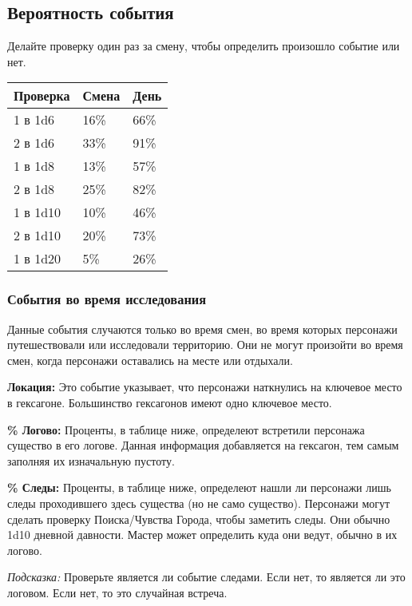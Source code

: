 \subsection*{Вероятность события}

Делайте проверку один раз за смену, чтобы определить произошло событие или нет.

\begin{table}[H]
  \centering
  \begin{tabular}{*3{l}}
    \toprule
    Проверка & Смена & День \\
    \midrule
    1 в 1d6 & 16\% & 66\% \\
    2 в 1d6 & 33\% & 91\% \\
    1 в 1d8 & 13\% & 57\% \\
    2 в 1d8 & 25\% & 82\% \\
    1 в 1d10 & 10\% & 46\% \\
    2 в 1d10 & 20\% & 73\% \\
    1 в 1d20 & 5\% & 26\% \\
    \bottomrule
  \end{tabular}
\end{table}

\subsubsection*{События во время исследования}

Данные события случаются только во время смен, во время которых персонажи путешествовали
или исследовали территорию. Они не могут произойти во время смен, когда персонажи оставались на месте
или отдыхали.

\textbf{Локация:} Это событие указывает, что персонажи наткнулись на ключевое место в гексагоне.
Большинство гексагонов имеют одно ключевое место.

\textbf{\% Логово:} Проценты, в таблице ниже, определеют встретили персонажа существо в его логове.
Данная информация добавляется на гексагон, тем самым заполняя их изначальную пустоту.

\textbf{\% Следы:} Проценты, в таблице ниже, определеют нашли ли персонажи лишь следы проходившего здесь существа
(но не само существо). Персонажи могут сделать проверку Поиска/Чувства Города, чтобы заметить следы. Они обычно
1d10 дневной давности. Мастер может определить куда они ведут, обычно в их логово.

\textit{Подсказка:} Проверьте является ли событие следами. Если нет, то является ли это логовом.
Если нет, то это случайная встреча.


